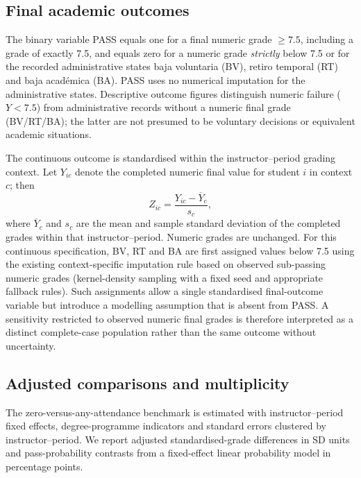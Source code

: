 \subsection{Final academic outcomes}

The binary variable PASS equals one for a final numeric grade $\geq7.5$, including a grade of exactly 7.5, and equals zero for a numeric grade \emph{strictly} below 7.5 or for the recorded administrative states baja voluntaria (BV), retiro temporal (RT) and baja acad\'emica (BA). PASS uses no numerical imputation for the administrative states. Descriptive outcome figures distinguish numeric failure ($Y<7.5$) from administrative records without a numeric final grade (BV/RT/BA); the latter are not presumed to be voluntary decisions or equivalent academic situations.

The continuous outcome is standardised within the instructor--period grading context. Let $Y_{ic}$ denote the completed numeric final value for student $i$ in context $c$; then
\begin{equation}
Z_{ic}=\frac{Y_{ic}-\overline{Y}_c}{s_c},
\end{equation}
where $\overline{Y}_c$ and $s_c$ are the mean and sample standard deviation of the completed grades within that instructor--period. Numeric grades are unchanged. For this continuous specification, BV, RT and BA are first assigned values below 7.5 using the existing context-specific imputation rule based on observed sub-passing numeric grades (kernel-density sampling with a fixed seed and appropriate fallback rules). Such assignments allow a single standardised final-outcome variable but introduce a modelling assumption that is absent from PASS. A sensitivity restricted to observed numeric final grades is therefore interpreted as a distinct complete-case population rather than the same outcome without uncertainty.

\subsection{Adjusted comparisons and multiplicity}

The zero-versus-any-attendance benchmark is estimated with instructor--period fixed effects, degree-programme indicators and standard errors clustered by instructor--period. We report adjusted standardised-grade differences in SD units and pass-probability contrasts from a fixed-effect linear probability model in percentage points.

